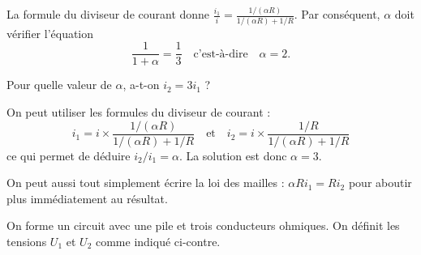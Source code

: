 
\begin{corrige}
La formule du diviseur de courant donne $\frac{i_1}{i}=\frac{1/(\alpha R)}{1/(\alpha R)+1/R}$. Par conséquent, $\alpha$ doit vérifier l'équation 
\[
	\frac{1}{1+\alpha}=\frac13
	\quad\text{c'est-à-dire}\quad
	\alpha=2.
\]
\end{corrige}

\begin{enonce}
Pour quelle valeur de $\alpha$, a-t-on $i_2=3 i_1$ ?
\end{enonce}


\begin{corrige}
On peut utiliser les formules du diviseur de courant : 
\[
	i_1=i\times\frac{1/(\alpha R)}{1/(\alpha R)+1/R}
	\quad\text{et}\quad
	i_2=i\times\frac{1/R}{1/(\alpha R)+1/R}
\]
ce qui permet de déduire $i_2/i_1=\alpha$. La solution est donc $\alpha=3$.

On peut aussi tout simplement écrire la loi des mailles : $\alpha R i_1=Ri_2$ pour aboutir plus immédiatement au résultat.
\end{corrige}

\finEntrainement



\hauteurLargeurCadreReponse		{8mm}{25mm}
\typeEntrainement				{} %
\initialisationEntrainement
                                \initialisationPartieGauche %
On forme un circuit avec une pile et trois conducteurs ohmiques. On définit les tensions $U_1$ et $U_2$ comme indiqué ci-contre. 

